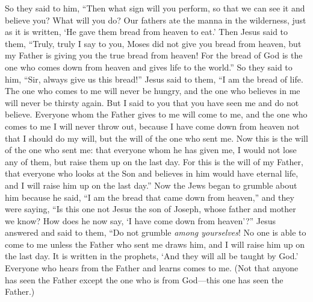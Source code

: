 \begin{biblechapter}
\verse So they said to him, “Then what sign will you perform, so that we can see it and believe you? What will you do?
\verse Our fathers ate the manna in the wilderness, just as it is written, ‘He gave them bread from heaven to eat.’
\verse Then Jesus said to them, “Truly, truly I say to you, Moses did not give you bread from heaven, but my Father is giving you the true bread from heaven!
\verse For the bread of God is the one who comes down from heaven and gives life to the world.”
\verse So they said to him, “Sir, always give us this bread!”
\verse Jesus said to them, “I am the bread of life. The one who comes to me will never be hungry, and the one who believes in me will never be thirsty again.
\verse But I said to you that you have seen me and do not believe.
\verse Everyone whom the Father gives to me will come to me, and the one who comes to me I will never throw out,
\verse because I have come down from heaven not that I should do my will, but the will of the one who sent me.
\verse Now this is the will of the one who sent me: that everyone whom he has given me, I would not lose any of them, but raise them up on the last day.
\verse For this is the will of my Father, that everyone who looks at the Son and believes in him would have eternal life, and I will raise him up on the last day.”
\verse Now the Jews began to grumble about him because he said, “I am the bread that came down from heaven,”
\verse and they were saying, “Is this one not Jesus the son of Joseph, whose father and mother we know? How does he now say, ‘I have come down from heaven’?”
\verse Jesus answered and said to them, “Do not grumble \textit{among yourselves}!
\verse No one is able to come to me unless the Father who sent me draws him, and I will raise him up on the last day.
\verse It is written in the prophets, ‘And they will all be taught by God.’ Everyone who hears from the Father and learns comes to me.
\verse (Not that anyone has seen the Father except the one who is from God—this one has seen the Father.)

\end{biblechapter}
